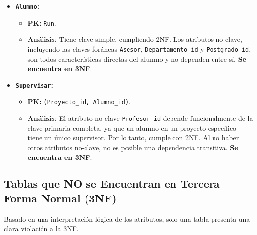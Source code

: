 \begin{itemize}
    \item \textbf{\texttt{Alumno}:}
    \begin{itemize}
        \item \textbf{PK:} \texttt{Run}.
        \item \textbf{Análisis:} Tiene clave simple, cumpliendo 2NF. Los atributos no-clave, incluyendo las claves foráneas \texttt{Asesor}, \texttt{Departamento\_id} y \texttt{Postgrado\_id}, son todos características directas del alumno y no dependen entre sí. \textbf{Se encuentra en 3NF}.
    \end{itemize}

    \item \textbf{\texttt{Supervisar}:}
    \begin{itemize}
        \item \textbf{PK:} \texttt{(Proyecto\_id, Alumno\_id)}.
        \item \textbf{Análisis:} El atributo no-clave \texttt{Profesor\_id} depende funcionalmente de la clave primaria completa, ya que un alumno en un proyecto específico tiene un único supervisor. Por lo tanto, cumple con 2NF. Al no haber otros atributos no-clave, no es posible una dependencia transitiva. \textbf{Se encuentra en 3NF}.
    \end{itemize}
\end{itemize}

\subsection{Tablas que NO se Encuentran en Tercera Forma Normal (3NF)}\label{s:normalizado}

Basado en una interpretación lógica de los atributos, solo una tabla presenta una clara violación a la 3NF.


